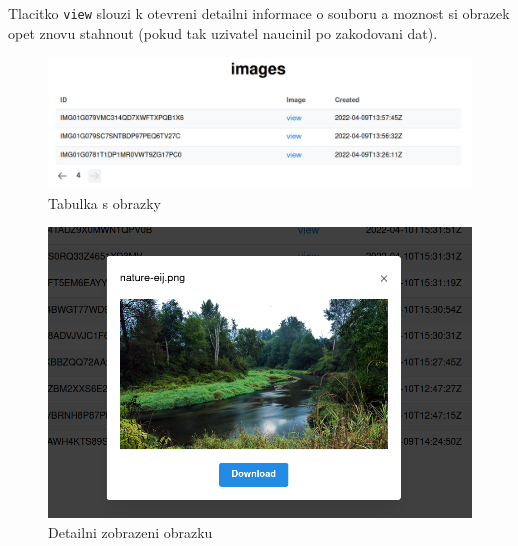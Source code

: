 Tlacitko \texttt{view} slouzi k otevreni detailni informace o souboru a
moznost si obrazek opet znovu stahnout (pokud tak uzivatel naucinil po
zakodovani dat).

\begin{figure}
    \centering
    \includegraphics[scale=0.5]{assets/images/images-table}
    \caption{Tabulka s obrazky}\label{fig:tabulka-obrazky}
\end{figure}

\begin{figure}
    \centering
    \includegraphics[scale=0.5]{assets/images/image-detail}
    \caption{Detailni zobrazeni obrazku}\label{fig:detail-obrazek}
\end{figure}
